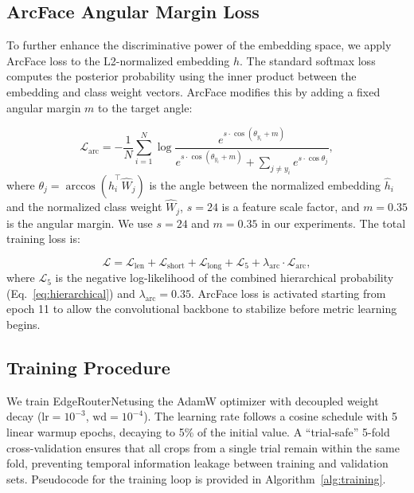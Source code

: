 \documentclass[conference]{IEEEtran}
\newcommand{\method}{EdgeRouterNet}
\begin{document}
\subsection{ArcFace Angular Margin Loss}
To further enhance the discriminative power of the embedding space, we apply ArcFace loss \cite{deng2019arcface} to the L2-normalized embedding $h$. The standard softmax loss computes the posterior probability using the inner product between the embedding and class weight vectors. ArcFace modifies this by adding a fixed angular margin $m$ to the target angle:

\begin{equation}
	\mathcal{L}_{\text{arc}} = -\frac{1}{N} \sum_{i=1}^N \log
	\frac{e^{s \cdot \cos(\theta_{y_i} + m)}}{e^{s \cdot \cos(\theta_{y_i} + m)} + \sum_{j \neq y_i} e^{s \cdot \cos\theta_j}},
\end{equation}
where $\theta_j = \arccos(\hat{h}_i^{\top} \hat{W}_j)$ is the angle between the normalized embedding $\hat{h}_i$ and the normalized class weight $\hat{W}_j$, $s = 24$ is a feature scale factor, and $m = 0.35$ is the angular margin. We use $s = 24$ and $m = 0.35$ in our experiments. The total training loss is:

\begin{equation}
	\mathcal{L} = \mathcal{L}_{\text{len}} + \mathcal{L}_{\text{short}} + \mathcal{L}_{\text{long}} + \mathcal{L}_{\text{5}} + \lambda_{\text{arc}} \cdot \mathcal{L}_{\text{arc}},
\end{equation}
where $\mathcal{L}_5$ is the negative log-likelihood of the combined hierarchical probability (Eq.~\ref{eq:hierarchical}) and $\lambda_{\text{arc}} = 0.35$. ArcFace loss is activated starting from epoch 11 to allow the convolutional backbone to stabilize before metric learning begins.

\subsection{Training Procedure}
We train \method using the AdamW optimizer with decoupled weight decay ($\text{lr} = 10^{-3}$, $\text{wd} = 10^{-4}$). The learning rate follows a cosine schedule with 5 linear warmup epochs, decaying to 5\% of the initial value. A ``trial-safe'' 5-fold cross-validation ensures that all crops from a single trial remain within the same fold, preventing temporal information leakage between training and validation sets. Pseudocode for the training loop is provided in Algorithm~\ref{alg:training}.
\end{document}
